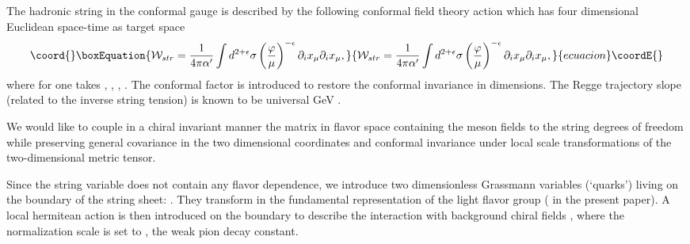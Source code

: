 \documentclass[a4paper,12pt]{article}
\begin{document}
The hadronic string in the conformal gauge is described by the following
conformal field theory action which has four dimensional Euclidean
space-time as target space
\begin{equation}\coord{}\boxEquation{
{\cal W}_{str}=\frac{1}{4\pi\alpha'}\int d^{2+\epsilon}\sigma
\left(\frac{\varphi}{\mu}\right)^{-\epsilon} 
\partial_i x_\mu \partial_i x_\mu, 
\label{string}
}{
{\cal W}_{str}=\frac{1}{4\pi\alpha'}\int d^{2+\epsilon}\sigma
\left(\frac{\varphi}{\mu}\right)^{-\epsilon} 
\partial_i x_\mu \partial_i x_\mu, 
}{ecuacion}\coordE{}\end{equation} 
where for \coordHE{} one takes 
\coordHE{}, \coordHE{},
\coordHE{}, \coordHE{}. 
The conformal factor \myHighlight{$\varphi(\tau, \sigma)$}\coordHE{} is 
introduced to restore the conformal 
invariance in \coordHE{} dimensions. The Regge trajectory slope
(related to the inverse string tension) is known
to be universal \coordHE{} GeV\coordHE{} \cite{lia}.

We would like to couple in a chiral invariant manner
the matrix in flavor space \coordHE{} containing  the meson fields to the
string degrees of freedom while preserving
general covariance in the two dimensional coordinates and conformal
invariance under local scale transformations
of the two-dimensional metric tensor.

Since the string variable \coordHE{} does not contain any flavor dependence,
we introduce two dimensionless Grassmann variables (`quarks')
living on the
boundary of the string sheet: 
\coordHE{}. They transform in the fundamental representation
of the light flavor group (\coordHE{} in the present paper).
A local hermitean action \coordHE{} is then introduced 
on the boundary
\coordHE{} to describe the interaction with background chiral fields 
\coordHE{}, where the normalization scale is
set to \coordHE{}, 
the weak pion decay constant.
\end{document}
